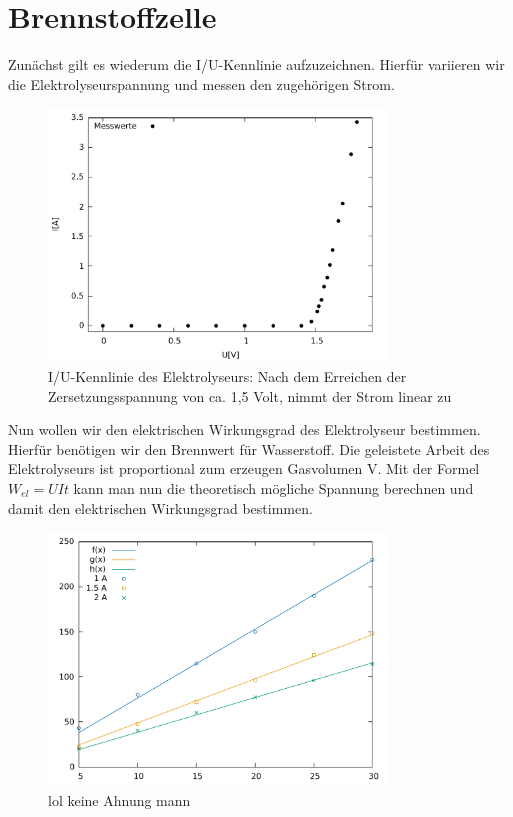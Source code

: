 \section{Brennstoffzelle}
Zunächst gilt es wiederum die I/U-Kennlinie aufzuzeichnen. Hierfür variieren wir die Elektrolyseurspannung und messen den zugehörigen Strom.
\begin{figure}[htbp]
	\centering
	\includegraphics[width=0.8\textwidth]{mess/aufg7.pdf}
	\caption{I/U-Kennlinie des Elektrolyseurs: Nach dem Erreichen der Zersetzungsspannung von ca. 1,5 Volt, nimmt der Strom linear zu}
	\label{a7}
\end{figure}

Nun wollen wir den elektrischen Wirkungsgrad des Elektrolyseur bestimmen. Hierfür benötigen wir den Brennwert für Wasserstoff. 
Die geleistete Arbeit des Elektrolyseurs ist proportional zum erzeugen Gasvolumen V. Mit der Formel $W_{el}=UIt$ kann man nun die theoretisch mögliche Spannung berechnen und damit den elektrischen Wirkungsgrad bestimmen.
\begin{figure}[htbp]
	\centering
	\includegraphics[width=0.8\textwidth]{mess/aufg8.pdf}
	\caption{lol keine Ahnung mann}
	\label{a8}
\end{figure}


